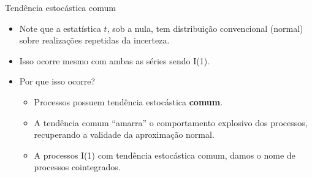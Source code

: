 \documentclass[11pt]{beamer}
\begin{document}
\begin{frame}{Tendência estocástica comum}
	\begin{itemize}
		\item Note que a estatística $t$, sob a nula, tem distribuição convencional (normal) sobre realizações repetidas da incerteza.
		\item Isso ocorre mesmo com ambas as séries sendo I(1).
		\item Por que isso ocorre?
		\begin{itemize}
			\item Processos possuem tendência estocástica {\color{blue}\textbf{comum}}.
			\item A tendência comum ``amarra'' o comportamento explosivo dos processos, recuperando a validade da aproximação normal.
			\item A processos I(1) com tendência estocástica comum, damos o nome de {\color{blue}processos cointegrados}.
		\end{itemize}
	\end{itemize}
\end{frame}
\end{document}
